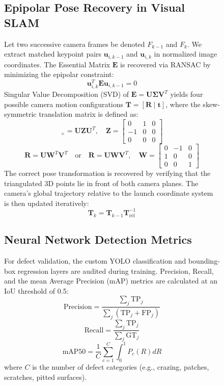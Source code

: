 \documentclass[conference]{IEEEtran}
\begin{document}
\begin{figure}[t]
\subsection{Epipolar Pose Recovery in Visual SLAM}
Let two successive camera frames be denoted $F_{k-1}$ and $F_k$. We extract matched keypoint pairs $\mathbf{u}_{i, k-1}$ and $\mathbf{u}_{i, k}$ in normalized image coordinates. The Essential Matrix $\mathbf{E}$ is recovered via RANSAC by minimizing the epipolar constraint:
\begin{equation}
\mathbf{u}_{i, k}^T \mathbf{E} \mathbf{u}_{i, k-1} = 0
\end{equation}
Singular Value Decomposition (SVD) of $\mathbf{E} = \mathbf{U} \mathbf{\Sigma} \mathbf{V}^T$ yields four possible camera motion configurations $\mathbf{T} = [\mathbf{R} \mid \mathbf{t}]$, where the skew-symmetric translation matrix is defined as:
\begin{equation}
[\mathbf{t}]_{\times} = \mathbf{U} \mathbf{Z} \mathbf{U}^T, \quad \mathbf{Z} = \begin{bmatrix} 0 & 1 & 0 \\ -1 & 0 & 0 \\ 0 & 0 & 0 \end{bmatrix}
\end{equation}
\begin{equation}
\mathbf{R} = \mathbf{U} \mathbf{W}^T \mathbf{V}^T \quad \text{or} \quad \mathbf{R} = \mathbf{U} \mathbf{W} \mathbf{V}^T, \quad \mathbf{W} = \begin{bmatrix} 0 & -1 & 0 \\ 1 & 0 & 0 \\ 0 & 0 & 1 \end{bmatrix}
\end{equation}
The correct pose transformation is recovered by verifying that the triangulated 3D points lie in front of both camera planes. The camera's global trajectory relative to the launch coordinate system is then updated iteratively:
\begin{equation}
\mathbf{T}_k = \mathbf{T}_{k-1} \mathbf{T}_{\text{rel}}^{-1}
\end{equation}

\subsection{Neural Network Detection Metrics}
For defect validation, the custom YOLO classification and bounding-box regression layers are audited during training. Precision, Recall, and the mean Average Precision (mAP) metrics are calculated at an IoU threshold of 0.5:
\begin{equation}
\text{Precision} = \frac{\sum_{j} \text{TP}_j}{\sum_{j} (\text{TP}_j + \text{FP}_j)}
\end{equation}
\begin{equation}
\text{Recall} = \frac{\sum_{j} \text{TP}_j}{\sum_{j} \text{GT}_j}
\end{equation}
\begin{equation}
\text{mAP50} = \frac{1}{C} \sum_{c=1}^{C} \int_{0}^{1} P_c(R) dR
\end{equation}
where $C$ is the number of defect categories (e.g., crazing, patches, scratches, pitted surfaces).


\end{figure}
\end{document}
